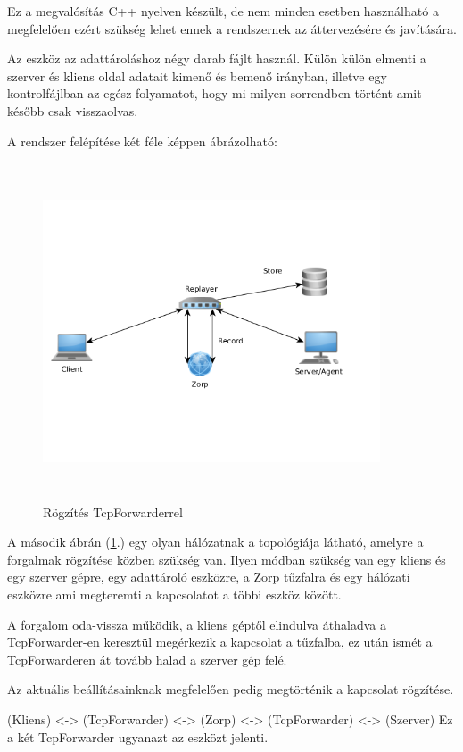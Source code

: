 \documentclass[a4paper,12pt,oneside]{report}
\begin{document}
Ez a megvalósítás C++ nyelven készült, de nem minden esetben használható a megfelelően ezért szükség lehet ennek a rendszernek az áttervezésére és javítására.

Az eszköz az adattároláshoz négy darab fájlt használ. 
Külön külön elmenti a szerver és kliens oldal adatait kimenő és bemenő irányban, illetve egy kontrolfájlban az egész folyamatot, hogy mi milyen sorrendben történt amit később csak 
visszaolvas.

A rendszer felépítése két féle képpen ábrázolható:

\begin{figure}[h]
  \includegraphics[width=10cm,height=10cm,keepaspectratio]{record.png}
  \caption{Rögzítés TcpForwarderrel}
  \label{fig:record}
\end{figure}

A második ábrán (\ref{fig:record}.) egy olyan hálózatnak a topológiája látható, amelyre a forgalmak rögzítése közben szükség van.
Ilyen módban szükség van egy kliens és egy szerver gépre, egy adattároló eszközre, a Zorp tűzfalra és egy hálózati eszközre ami megteremti a kapcsolatot a többi eszköz között.

A forgalom oda-vissza működik, a kliens géptől elindulva áthaladva a TcpForwarder-en keresztül megérkezik a kapcsolat a tűzfalba, ez után ismét a TcpForwarderen át tovább halad a szerver gép felé.

Az aktuális beállításainknak megfelelően pedig megtörténik a kapcsolat rögzítése.

(Kliens) <-> (TcpForwarder) <-> (Zorp) <-> (TcpForwarder) <-> (Szerver) 
Ez a két TcpForwarder ugyanazt az eszközt jelenti.
\end{document}
